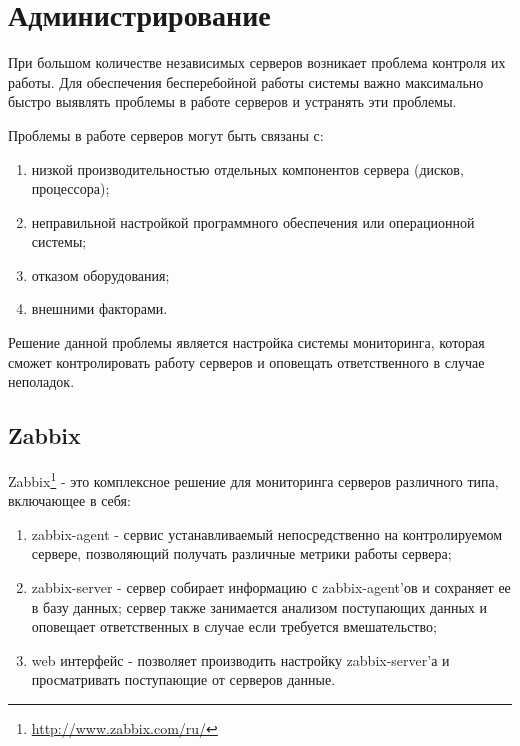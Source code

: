 \section{Администрирование}
При большом количестве независимых серверов возникает проблема контроля их
работы. Для обеспечения бесперебойной работы системы важно максимально быстро
выявлять проблемы в работе серверов и устранять эти проблемы.
	
Проблемы в работе серверов могут быть связаны с:
\begin{enumerate}
  \item низкой производительностью отдельных компонентов сервера (дисков, процессора);
  \item неправильной настройкой программного обеспечения или операционной
системы; 
  \item отказом оборудования;
  \item внешними факторами.
\end{enumerate}

Решение данной проблемы является настройка системы мониторинга, которая сможет
контролировать работу серверов и оповещать ответственного в случае неполадок.	

\subsection{Zabbix}
Zabbix\footnote{
	\url{http://www.zabbix.com/ru/}
} - это комплексное решение для мониторинга серверов различного типа,
включающее в себя:
\begin{enumerate}
  \item zabbix-agent - сервис устанавливаемый непосредственно на контролируемом сервере, позволяющий получать различные метрики работы сервера;
  \item zabbix-server - сервер собирает информацию с zabbix-agent’ов и сохраняет
ее в базу данных; сервер также занимается анализом поступающих данных и оповещает ответственных в случае если требуется вмешательство; 
  \item web интерфейс - позволяет производить настройку zabbix-server’а и
просматривать поступающие от серверов данные.
\end{enumerate}